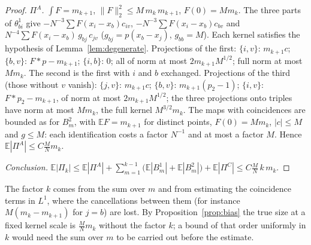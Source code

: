 \begin{proof}
\emph{$\Pi^A$.} $\int F=m_{k+1}$, $\|F\|_2^2\le M\,m_k\,m_{k+1}$, $F(0)=Mm_k$. The three parts of
$\theta^1_{bi}$ give $-N^{-3}\sum F(x_i-x_b)c_{iv}$, $-N^{-3}\sum F(x_i-x_b)c_{bv}$ and
$N^{-4}\sum F(x_i-x_b)\,g_{bj}\,c_{jv}$ ($g_{bj}=p(x_b-x_j)$, $g_{bb}=M$). Each kernel satisfies the
hypothesis of Lemma~\ref{lem:degenerate}. Projections of the first: $\{i,v\}$: $m_{k+1}c$; $\{b,v\}$:
$F*p-m_{k+1}$; $\{i,b\}$: $0$; all of norm at most $2m_{k+1}M^{1/2}$; full norm at most $Mm_k$. The second
is the first with $i$ and $b$ exchanged. Projections of the third (those without $v$ vanish):
$\{j,v\}$: $m_{k+1}c$; $\{b,v\}$: $m_{k+1}(p_2-1)$; $\{i,v\}$: $F*p_2-m_{k+1}$, of norm at most
$2m_{k+1}M^{1/2}$; the three projections onto triples have norm at most $Mm_k$, the full kernel
$M^{3/2}m_k$. The maps with coincidences are bounded as for $B^2_m$, with $\mathbb EF=m_{k+1}$ for distinct
points, $F(0)=Mm_k$, $|c|\le M$ and $g\le M$: each identification costs a factor $N^{-1}$ and at most a
factor $M$. Hence $\mathbb E|\Pi^A|\le C\frac MNm_k$.

\emph{Conclusion.} $\mathbb E|\Pi_k|\le\mathbb E|\Pi^A|+\sum_{m=1}^{k-1}\big(\mathbb E|B^1_m|+\mathbb E|B^2_m|\big)
+\mathbb E|\Pi^C|\le C\frac MN\,k\,m_k$.
\end{proof}

\begin{remark}
The factor $k$ comes from the sum over $m$ and from estimating the coincidence terms in $L^1$, where the
cancellations between them (for instance $M(m_k-m_{k+1})$ for $j=b$) are lost. By
Proposition~\ref{prop:bias} the true size at a fixed kernel scale is $\frac MNm_k$ without the factor
$k$; a bound of that order uniformly in $k$ would need the sum over $m$ to be carried out before the
estimate.
\end{remark}
